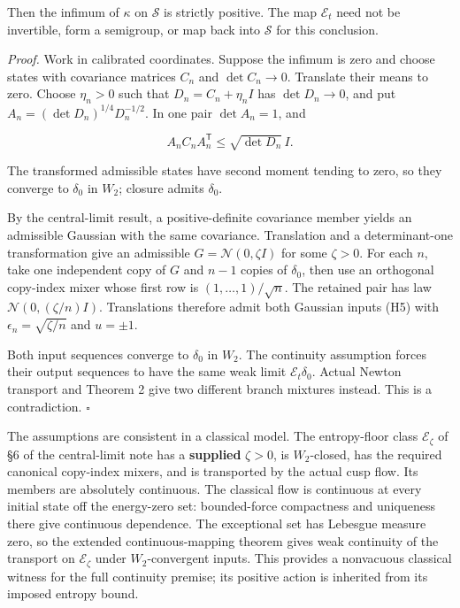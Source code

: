 \documentclass[11pt,a4paper]{article}
\begin{document}
Then the infimum of \(\kappa\) on \(\mathcal S\) is strictly positive.
The map \(\mathcal E_t\) need not be invertible, form a semigroup, or
map back into \(\mathcal S\) for this conclusion.

\emph{Proof.} Work in calibrated coordinates. Suppose the infimum is
zero and choose states with covariance matrices \(C_n\) and
\(\det C_n\to0\). Translate their means to zero. Choose \(\eta_n>0\)
such that \(D_n=C_n+\eta_n I\) has \(\det D_n\to0\), and put
\(A_n=(\det D_n)^{1/4}D_n^{-1/2}\). In one pair \(\det A_n=1\), and

\[
 A_nC_nA_n^{\mathsf T}\le\sqrt{\det D_n}\,I. \tag{H12a}
\]

The transformed admissible states have second moment tending to zero, so
they converge to \(\delta_0\) in \(W_2\); closure admits \(\delta_0\).

By the central-limit result, a positive-definite covariance member
yields an admissible Gaussian with the same covariance. Translation and
a determinant-one transformation give an admissible
\(G=\mathcal N(0,\zeta I)\) for some \(\zeta>0\). For each \(n\), take
one independent copy of \(G\) and \(n-1\) copies of \(\delta_0\), then
use an orthogonal copy-index mixer whose first row is
\((1,\ldots,1)/\sqrt n\). The retained pair has law
\(\mathcal N(0,(\zeta/n)I)\). Translations therefore admit both Gaussian
inputs (H5) with \(\epsilon_n=\sqrt{\zeta/n}\) and \(u=\pm1\).

Both input sequences converge to \(\delta_0\) in \(W_2\). The continuity
assumption forces their output sequences to have the same weak limit
\(\mathcal E_t\delta_0\). Actual Newton transport and Theorem 2 give two
different branch mixtures instead. This is a contradiction. \(\square\)

The assumptions are consistent in a classical model. The entropy-floor
class \(\mathcal E_\zeta\) of §6 of the central-limit note has a
\textbf{supplied} \(\zeta>0\), is \(W_2\)-closed, has the required
canonical copy-index mixers, and is transported by the actual cusp flow.
Its members are absolutely continuous. The classical flow is continuous
at every initial state off the energy-zero set: bounded-force
compactness and uniqueness there give continuous dependence. The
exceptional set has Lebesgue measure zero, so the extended
continuous-mapping theorem gives weak continuity of the transport on
\(\mathcal E_\zeta\) under \(W_2\)-convergent inputs. This provides a
nonvacuous classical witness for the full continuity premise; its
positive action is inherited from its imposed entropy bound.
\end{document}
